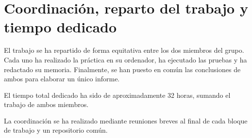\documentclass[12pt]{article}
\begin{document}
\newpage
\section{Coordinación, reparto del trabajo y tiempo dedicado}

El trabajo se ha repartido de forma equitativa entre los dos miembros del grupo. Cada uno ha realizado la práctica en su ordenador, ha ejecutado las pruebas y ha redactado su memoria. Finalmente, se han puesto en común las conclusiones de ambos para elaborar un único informe.

El tiempo total dedicado ha sido de aproximadamente 32 horas, sumando el trabajo de ambos miembros.

La coordinación se ha realizado mediante reuniones breves al final de cada bloque de trabajo y un repositorio común.
\end{document}
